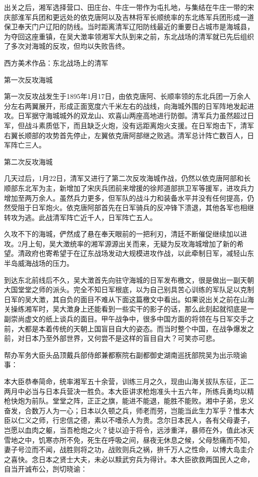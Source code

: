 \documentclass[12pt,UTF8]{ctexbook}
\begin{document}
出关之后，湘军选择营口、田庄台、牛庄一带作为屯扎地，与集结在牛庄一带的宋庆部淮军兵团和更远处的依克唐阿以及吉林将军长顺统率的东北练军兵团形成一道保卫奉天门户辽阳的防线。当时距离清军辽阳防线最近的重要日占城市是海城县，为夺回这座重镇，在吴大澂率领湘军大队到来之前，东北战场的清军就已先后组织了多次对海城的反攻，但均以失败告终。


西方美术作品：东北战场上的清军

第一次反攻海城

第一次反攻战发生于1895年1月17日，由依克唐阿、长顺率领的东北兵团一万余人分左右两翼展开，形成正面宽度六千米左右的战线，向海城外围的日军阵地发起进攻。日军据守海城城外的双龙山、欢喜山两座高地进行防御。清军兵力虽然超过日军，但战斗素质低下，而且缺乏火炮，没有远距离炮火支援。在日军炮击下，清军右翼长顺部的攻势首先停止，左翼依克唐阿部继之败逃。清军总计阵亡数百人，日军阵亡三人。

第二次反攻海城

几天过后，1月22日，清军又进行了第二次反攻海城作战，仍然以依克唐阿部和长顺部东北军为主，新增加了宋庆兵团前来增援的徐邦道部拱卫军等援军，进攻兵力增加至两万余人。虽然兵力更多，但军队的战斗力和装备水平并没有任何提高，仍然受阻于日军炮火。依克唐阿部首先在日军骑兵的反冲锋下溃退，其他各军也相继转攻为逃。此战清军阵亡近千人，日军阵亡五人。

久攻不下的海城，俨然成了悬在奉天眼前的一把利刃，清廷不断催促继续加以进攻。2月上旬，吴大澂统率的湘军源源出关而来，无疑为反攻海城增加了新的希望。清政府也寄希望于在辽东战场发动大规模进攻作战，以此牵制日军，减轻山东半岛威海战场的压力。

到达东北前线后不久，吴大澂首先向驻守海城的日军发布檄文，很是做出一副天朝大国堂堂之师的派头。完全不知日军根底，以为自己别具苦心训练的军队足以克制日军的吴大澂，其自负的面目不难从下面这篇檄文中看出。如果说出关之前在山海关操练湘军时，吴大澂身上还能看到一些实干的影子的话，那么此刻起就彻底是一副崇尚虚文的纸上谈兵的面目。甲午战争中，很多中国方面的将领在与日军交手之前，大都是本着传统的天朝上国盲目自大的姿态。而当时整个中国，在战争爆发之前，对日本乃至外部世界，又何尝不是这样的盲目自大？可笑亦可悲。

帮办军务大臣头品顶戴兵部侍郎兼都察院右副都御史湖南巡抚部院吴为出示晓谕事：

本大臣恭奉简命，统率湘军五十余营，训练三月之久，现由山海关拔队东征，正二两月中必当与日本兵营决一胜负。本大臣讲求枪炮准头十五六年，所练兵勇均以精枪快炮为前队。堂堂之阵，正正之旗，能进不能退，能胜不能败。湘中子弟，忠义奋发，合数万人为一心；日本以久顿之兵，师老而劳，岂能当此生力军乎？惟本大臣以仁义之师，行忠信之德，素以不嗜杀人为贵。念尔日本民人，各有父母妻子，岂愿以血肉之躯，当吾枪炮之火？徒以迫于将令，远涉重洋，暴师在外，值此冰天雪地之中，饥寒亦所不免，死生在呼吸之间，昼夜无休息之候，父母愁痛而不知，妻子号泣而不闻，战胜则将之功，战败则兵之祸，拚千万人之性命，以博大岛圭介之喜快。念日本之贤士大夫，未必以黩武穷兵为得计。本大臣欲救两国民人之命，自当开诚布公，剀切晓谕：
\end{document}
